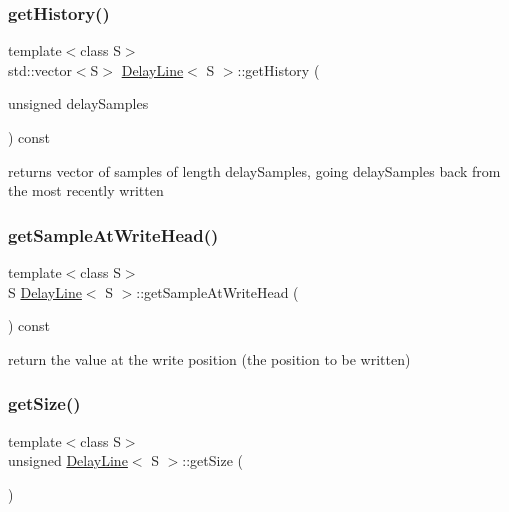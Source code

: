 \mbox{\label{classDelayLine_a35899bf190fe2684f3879645e758db78}} 
\subsubsection{\texorpdfstring{get\+History()}{getHistory()}}
{\footnotesize\ttfamily template$<$class S$>$ \\
std\+::vector$<$S$>$ \mbox{\hyperlink{classDelayLine}{Delay\+Line}}$<$ S $>$\+::get\+History (\begin{DoxyParamCaption}\item[{unsigned}]{delay\+Samples }\end{DoxyParamCaption}) const\hspace{0.3cm}{\ttfamily [inline]}}



returns vector of samples of length delay\+Samples, going delay\+Samples back from the most recently written 

\mbox{\label{classDelayLine_a21e079073490f2795e6b46d147a3153a}} 
\subsubsection{\texorpdfstring{get\+Sample\+At\+Write\+Head()}{getSampleAtWriteHead()}}
{\footnotesize\ttfamily template$<$class S$>$ \\
S \mbox{\hyperlink{classDelayLine}{Delay\+Line}}$<$ S $>$\+::get\+Sample\+At\+Write\+Head (\begin{DoxyParamCaption}{ }\end{DoxyParamCaption}) const\hspace{0.3cm}{\ttfamily [inline]}}



return the value at the write position (the position to be written) 

\mbox{\label{classDelayLine_a974138765f721f1978fe3fbb914f9184}} 
\subsubsection{\texorpdfstring{get\+Size()}{getSize()}}
{\footnotesize\ttfamily template$<$class S$>$ \\
unsigned \mbox{\hyperlink{classDelayLine}{Delay\+Line}}$<$ S $>$\+::get\+Size (\begin{DoxyParamCaption}{ }\end{DoxyParamCaption})\hspace{0.3cm}{\ttfamily [inline]}}



